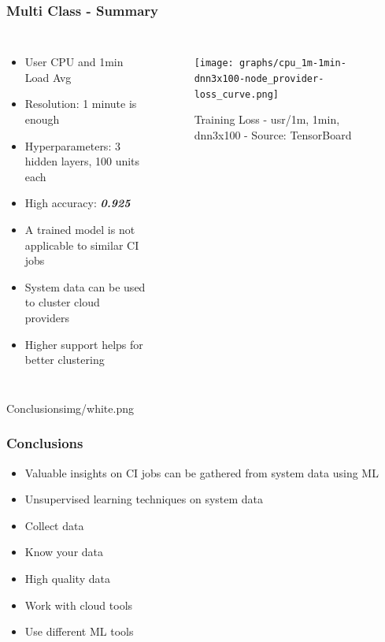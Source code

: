 \documentclass[aspectratio=169,11pt,hyperref={colorlinks=true}]{beamer}
\begin{document}
\begin{frame}
    \frametitle{Multi Class - Summary}
    \begin{columns}
        \begin{itemize}
            \item{User CPU and 1min Load Avg}
            \item{Resolution: 1 minute is enough}
            \item{Hyperparameters: 3 hidden layers, 100 units each}
            \item{High accuracy: \emph{\textbf{0.925}}}
            \item{A trained model is not applicable to similar CI jobs}
            \item{System data can be used to cluster cloud providers}
            \item{Higher support helps for better clustering}
        \end{itemize}
        \begin{figure}
          \begin{center}
            \texttt{[image: graphs/cpu\_1m-1min-dnn3x100-node\_provider-loss\_curve.png]}
              \caption{Training Loss - usr/1m, 1min, dnn3x100 - Source: TensorBoard}
          \end{center}
        \end{figure}
      \end{columns}
\end{frame}

\begin{sectionpic}
  {Conclusions}{img/white.png}
\end{sectionpic}

\begin{frame}
  \frametitle{Conclusions}
  \begin{itemize}
      \item{Valuable insights on CI jobs can be gathered from system data using ML}
      \item{Unsupervised learning techniques on system data}
      \item{Collect data}
      \item{Know your data}
      \item{High quality data}
      \item{Work with cloud tools}
      \item{Use different ML tools}
    \end{itemize}
\end{frame}
\end{document}

